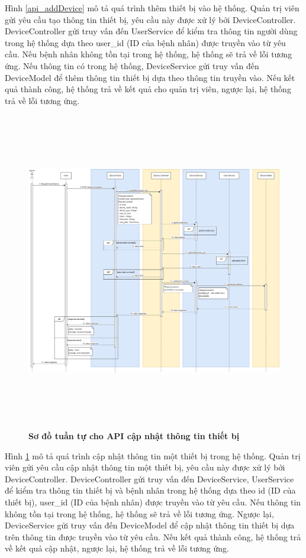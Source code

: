 Hình \ref{api_addDevice} mô tả quá trình thêm thiết bị vào hệ thống. Quản trị viên gửi yêu cầu tạo thông tin thiết bị, 
yêu cầu này được xử lý bởi DeviceController. DeviceController gửi truy vấn đến UserService để kiểm tra thông tin người dùng trong hệ thống dựa theo user\_id (ID của bệnh nhân) được truyền vào từ yêu cầu. 
Nếu bệnh nhân không tồn tại trong hệ thống, hệ thống sẽ trả về lỗi tương ứng. Nếu thông tin có trong hệ thống, DeviceService gửi truy vấn đến DeviceModel để thêm thông tin thiết bị 
dựa theo thông tin truyền vào. Nếu kết quả thành công, hệ thống trả về kết quả cho quản trị viên, ngược lại, hệ thống trả về lỗi tương ứng.

\begin{figure}[H]
  \centering
  \includegraphics[width=16cm,height=14cm]{Images/sequence_api/editDevice.png}
  \caption[Sơ đồ tuần tự cho API cập nhật thông tin thiết bị ]{\bfseries \fontsize{12pt}{0pt}
  \selectfont Sơ đồ tuần tự cho API cập nhật thông tin thiết bị }
  \label{api_editDevice} %
\end{figure}
Hình \ref{api_editDevice} mô tả quá trình cập nhật thông tin một thiết bị trong hệ thống. Quản trị viên gửi yêu cầu cập nhật thông tin một thiết bị, 
yêu cầu này được xử lý bởi DeviceController. DeviceController gửi truy vấn đến DeviceService, UserService để kiểm tra thông tin thiết bị và bệnh nhân trong hệ thống dựa theo id (ID của thiết bị),
 user\_id (ID của bệnh nhân) được truyền vào từ yêu cầu. Nếu thông tin không tồn tại trong hệ thống, hệ thống sẽ trả về lỗi tương ứng. Ngược lại, 
 DeviceService gửi truy vấn đến DeviceModel để cập nhật thông tin thiết bị dựa trên thông tin được truyền vào từ yêu cầu. Nếu kết quả thành công, hệ thống trả về kết quả cập nhật, ngược lại, hệ thống trả về lỗi tương ứng.


